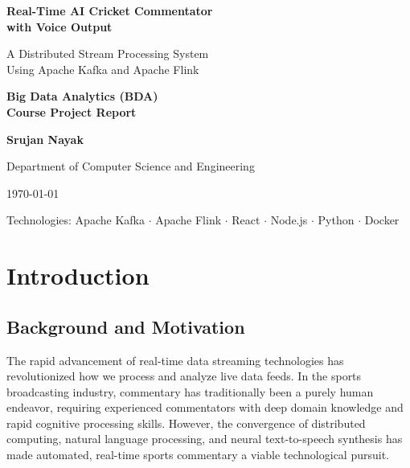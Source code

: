 \documentclass[12pt,a4paper]{article}
\begin{document}
\begin{titlepage}
\centering
\vspace*{1cm}
{\Huge\bfseries Real-Time AI Cricket Commentator\\with Voice Output\par}
\vspace{1.5cm}
{\Large A Distributed Stream Processing System\\Using Apache Kafka and Apache Flink\par}
\vspace{2cm}
{\large\bfseries Big Data Analytics (BDA)\\Course Project Report\par}
\vspace{2cm}
{\Large\bfseries Srujan Nayak\par}
\vspace{0.5cm}
{\large Department of Computer Science and Engineering\par}
\vspace{2cm}
{\large\today\par}
\vfill
{\large Technologies: Apache Kafka $\cdot$ Apache Flink $\cdot$ React $\cdot$ Node.js $\cdot$ Python $\cdot$ Docker\par}
\end{titlepage}

\tableofcontents
\newpage
\listoffigures
\listoftables
\newpage

\section{Introduction}

\subsection{Background and Motivation}
The rapid advancement of real-time data streaming technologies has revolutionized how we process and analyze live data feeds. In the sports broadcasting industry, commentary has traditionally been a purely human endeavor, requiring experienced commentators with deep domain knowledge and rapid cognitive processing skills. However, the convergence of distributed computing, natural language processing, and neural text-to-speech synthesis has made automated, real-time sports commentary a viable technological pursuit.
\end{document}
